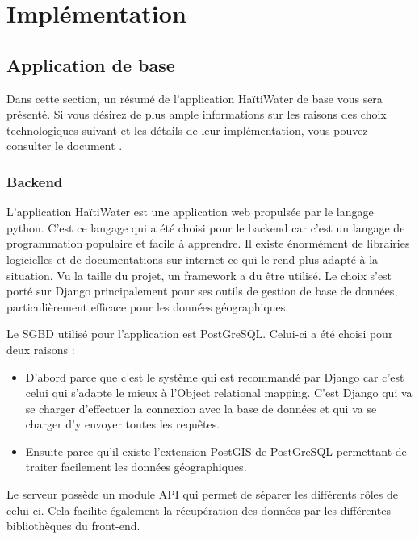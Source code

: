 \documentclass{EPL-master-thesis-covers-FR}
\begin{document}
			




	\chapter{Implémentation}

		\section{Application de base}
			Dans cette section, un résumé de l'application HaïtiWater de base vous sera présenté. Si vous désirez de plus ample informations sur les raisons des choix technologiques suivant et les détails de leur implémentation, vous pouvez consulter le document \cite{ref:haitiwater}.
			
			\subsection*{Backend}
				L'application HaïtiWater est une application web propulsée par le langage python. C'est ce langage qui a été choisi pour le backend car c'est un langage de programmation populaire et facile à apprendre. Il existe énormément de librairies logicielles et de documentations sur internet ce qui le rend plus adapté à la situation. Vu la taille du projet, un framework a du être utilisé. Le choix s'est porté sur Django principalement pour ses outils de gestion de base de données, particulièrement efficace pour les données géographiques.	
			
				Le SGBD utilisé pour l'application est PostGreSQL. Celui-ci a été choisi pour deux raisons :
				\begin{itemize}
					\item D'abord parce que c'est le système qui est recommandé par Django car c'est celui qui s'adapte le mieux à l'Object relational mapping. C'est Django qui va se charger d'effectuer la connexion avec la base de données et qui va se charger d'y envoyer toutes les requêtes.
					\item Ensuite parce qu'il existe l'extension PostGIS de PostGreSQL permettant de traiter facilement les données géographiques.
				\end{itemize}			
				
				Le serveur possède un module API qui permet de séparer les différents rôles de celui-ci. Cela facilite également la récupération des données par les différentes bibliothèques du front-end.
						
\end{document}
